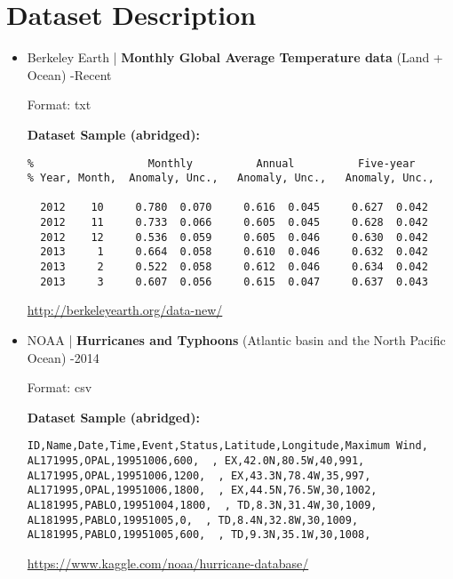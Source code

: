 \documentclass[fontsize=11pt]{article}
\begin{document}
\section*{Dataset Description}
\begin{itemize}

    \item Berkeley Earth | \textbf{Monthly Global Average Temperature data} (Land + Ocean) -Recent

    Format: txt

    \medskip

    \textbf{Dataset Sample (abridged):}
    \begin{verbatim}
%                  Monthly          Annual          Five-year
% Year, Month,  Anomaly, Unc.,   Anomaly, Unc.,   Anomaly, Unc.,

  2012    10     0.780  0.070     0.616  0.045     0.627  0.042
  2012    11     0.733  0.066     0.605  0.045     0.628  0.042
  2012    12     0.536  0.059     0.605  0.046     0.630  0.042
  2013     1     0.664  0.058     0.610  0.046     0.632  0.042
  2013     2     0.522  0.058     0.612  0.046     0.634  0.042
  2013     3     0.607  0.056     0.615  0.047     0.637  0.043
    \end{verbatim}
    \url{http://berkeleyearth.org/data-new/}

    \bigskip

    \item NOAA | \textbf{Hurricanes and Typhoons} (Atlantic
basin and the North Pacific Ocean) -2014

    Format: csv

    \medskip

    \textbf{Dataset Sample (abridged):}
    \begin{verbatim}
ID,Name,Date,Time,Event,Status,Latitude,Longitude,Maximum Wind,
AL171995,OPAL,19951006,600,  , EX,42.0N,80.5W,40,991,
AL171995,OPAL,19951006,1200,  , EX,43.3N,78.4W,35,997,
AL171995,OPAL,19951006,1800,  , EX,44.5N,76.5W,30,1002,
AL181995,PABLO,19951004,1800,  , TD,8.3N,31.4W,30,1009,
AL181995,PABLO,19951005,0,  , TD,8.4N,32.8W,30,1009,
AL181995,PABLO,19951005,600,  , TD,9.3N,35.1W,30,1008,
    \end{verbatim}
    \url{https://www.kaggle.com/noaa/hurricane-database/}

\end{itemize}
\end{document}
